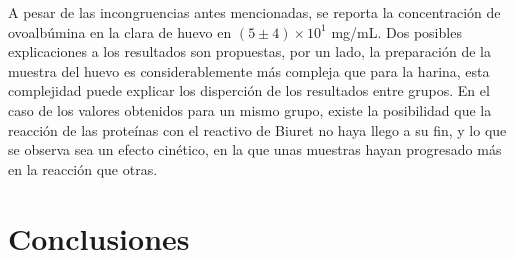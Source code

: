 \documentclass[fleqn,10pt]{SelfArx}
\begin{document}
	A pesar de las incongruencias antes mencionadas, se reporta la concentraci\'on de ovoalb\'umina en la clara de huevo en $(5\pm4)\times10^{1}$ mg/mL. Dos posibles explicaciones a los resultados son propuestas, por un lado, la preparaci\'on de la muestra del huevo es considerablemente m\'as compleja que para la harina, esta complejidad puede explicar los disperci\'on de los resultados entre grupos. En el caso de los valores obtenidos para un mismo grupo, existe la posibilidad que la reacci\'on de las prote\'inas con el reactivo de Biuret no haya llego a su fin, y lo que se observa sea un efecto cin\'etico, en la que unas muestras hayan progresado m\'as en la reacci\'on que otras. 

\section{Conclusiones}
	



\end{document}
